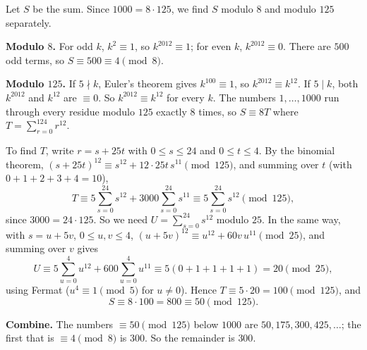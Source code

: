 Let $S$ be the sum. Since $1000=8\cdot125$, we find $S$ modulo $8$ and modulo $125$ separately.

\textbf{Modulo $8$.} For odd $k$, $k^2\equiv1$, so $k^{2012}\equiv1$; for even $k$, $k^{2012}\equiv0$. There are $500$ odd terms, so $S\equiv500\equiv4\pmod8$.

\textbf{Modulo $125$.} If $5\nmid k$, Euler's theorem gives $k^{100}\equiv1$, so $k^{2012}\equiv k^{12}$. If $5\mid k$, both $k^{2012}$ and $k^{12}$ are $\equiv0$. So $k^{2012}\equiv k^{12}$ for every $k$. The numbers $1,\dots,1000$ run through every residue modulo $125$ exactly $8$ times, so $S\equiv8T$ where $T=\sum_{r=0}^{124}r^{12}$.

To find $T$, write $r=s+25t$ with $0\le s\le24$ and $0\le t\le4$. By the binomial theorem, $(s+25t)^{12}\equiv s^{12}+12\cdot25t\,s^{11}\pmod{125}$, and summing over $t$ (with $0+1+2+3+4=10$),
\[T\equiv5\sum_{s=0}^{24}s^{12}+3000\sum_{s=0}^{24} s^{11}\equiv5\sum_{s=0}^{24}s^{12}\pmod{125},\]
since $3000=24\cdot125$. So we need $U=\sum_{s=0}^{24}s^{12}$ modulo $25$. In the same way, with $s=u+5v$, $0\le u,v\le4$, $(u+5v)^{12}\equiv u^{12}+60v\,u^{11}\pmod{25}$, and summing over $v$ gives
\[U\equiv5\sum_{u=0}^{4}u^{12}+600\sum_{u=0}^4 u^{11}\equiv5(0+1+1+1+1)=20\pmod{25},\]
using Fermat ($u^{4}\equiv1\pmod5$ for $u\ne0$). Hence $T\equiv5\cdot20=100\pmod{125}$, and
\[S\equiv8\cdot100=800\equiv50\pmod{125}.\]

\textbf{Combine.} The numbers $\equiv50\pmod{125}$ below $1000$ are $50,175,300,425,\dots$; the first that is $\equiv4\pmod8$ is $300$. So the remainder is $\boxed{300}$.
